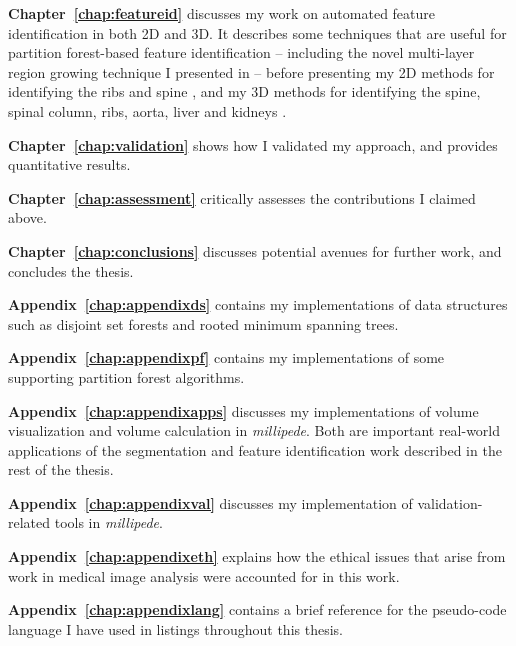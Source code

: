 \textbf{Chapter~\ref{chap:featureid}} discusses my work on automated feature identification in both 2D and 3D. It describes some techniques that are useful for partition forest-based feature identification -- including the novel multi-layer region growing technique I presented in \cite{gvcispa09} -- before presenting my 2D methods for identifying the ribs \cite{gvccimi08} and spine \cite{gvcispa09}, and my 3D methods for identifying the spine, spinal column, ribs, aorta, liver and kidneys \cite{gvcoucl10}.

\textbf{Chapter~\ref{chap:validation}} shows how I validated my approach, and provides quantitative results.

\textbf{Chapter~\ref{chap:assessment}} critically assesses the contributions I claimed above.

\textbf{Chapter~\ref{chap:conclusions}} discusses potential avenues for further work, and concludes the thesis.

\textbf{Appendix~\ref{chap:appendixds}} contains my implementations of data structures such as disjoint set forests and rooted minimum spanning trees.

\textbf{Appendix~\ref{chap:appendixpf}} contains my implementations of some supporting partition forest algorithms.

\textbf{Appendix~\ref{chap:appendixapps}} discusses my implementations of volume visualization and volume calculation in \emph{millipede}. Both are important real-world applications of the segmentation and feature identification work described in the rest of the thesis.

\textbf{Appendix~\ref{chap:appendixval}} discusses my implementation of validation-related tools in \emph{millipede}.

\textbf{Appendix~\ref{chap:appendixeth}} explains how the ethical issues that arise from work in medical image analysis were accounted for in this work.

\textbf{Appendix~\ref{chap:appendixlang}} contains a brief reference for the pseudo-code language I have used in listings throughout this thesis.
